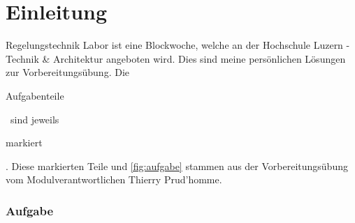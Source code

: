 \section*{Einleitung}
Regelungstechnik Labor ist eine Blockwoche, welche an der Hochschule Luzern - 
Technik \& Architektur angeboten wird. Dies sind meine persönlichen Lösungen 
zur Vorbereitungsübung. Die \begin{aufgabe}Aufgabenteile\end{aufgabe} ~sind 
jeweils \begin{aufgabe}markiert\end{aufgabe}. Diese markierten Teile und 
\autoref{fig:aufgabe} stammen aus der Vorbereitungsübung vom 
Modulverantwortlichen Thierry Prud'homme. 
\\
\subsubsection*{Aufgabe}
